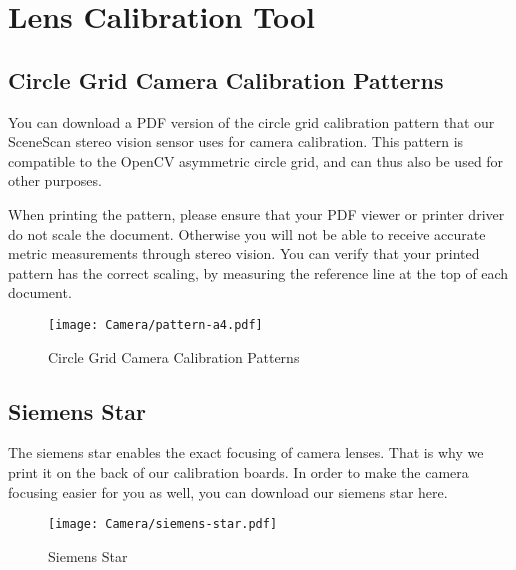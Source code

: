 %
%
%



\chapter{Lens Calibration Tool}


\section{Circle Grid Camera Calibration Patterns}

You can download a PDF version of the circle grid calibration pattern that our SceneScan stereo vision sensor uses for camera calibration. This pattern is compatible to the OpenCV asymmetric circle grid, and can thus also be used for other purposes.
    
When printing the pattern, please ensure that your PDF viewer or printer driver do not scale the document. Otherwise you will not be able to receive accurate metric measurements through stereo vision. You can verify that your printed pattern has the correct scaling, by measuring the reference line at the top of each document.

\begin{figure}
    \begin{center}
        \texttt{[image: Camera/pattern-a4.pdf]}
        
        \caption{Circle Grid Camera Calibration Patterns}
    \end{center}    
\end{figure}

\section{Siemens Star}

The siemens star enables the exact focusing of camera lenses. That is why we print it on the back of our calibration boards. In order to make the camera focusing easier for you as well, you can download our siemens star here.


\begin{figure}
    \begin{center}
        \texttt{[image: Camera/siemens-star.pdf]}
        
        \caption{Siemens Star}
    \end{center}    
\end{figure}

